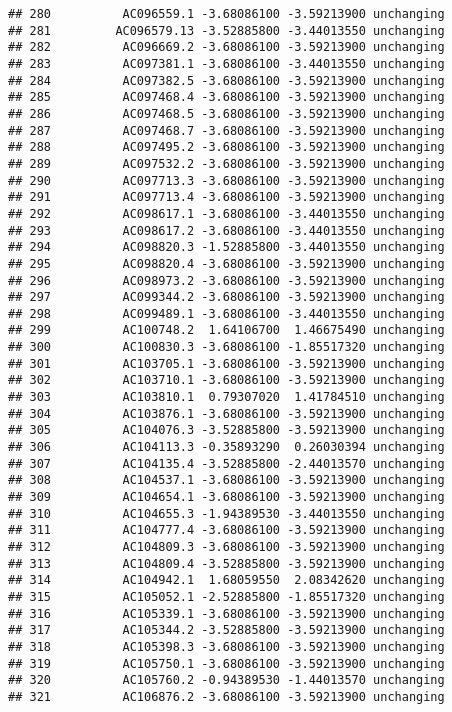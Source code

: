 \documentclass[]{article}
\begin{document}
\begin{verbatim}
## 280          AC096559.1 -3.68086100 -3.59213900 unchanging
## 281         AC096579.13 -3.52885800 -3.44013550 unchanging
## 282          AC096669.2 -3.68086100 -3.59213900 unchanging
## 283          AC097381.1 -3.68086100 -3.44013550 unchanging
## 284          AC097382.5 -3.68086100 -3.59213900 unchanging
## 285          AC097468.4 -3.68086100 -3.59213900 unchanging
## 286          AC097468.5 -3.68086100 -3.59213900 unchanging
## 287          AC097468.7 -3.68086100 -3.59213900 unchanging
## 288          AC097495.2 -3.68086100 -3.59213900 unchanging
## 289          AC097532.2 -3.68086100 -3.59213900 unchanging
## 290          AC097713.3 -3.68086100 -3.59213900 unchanging
## 291          AC097713.4 -3.68086100 -3.59213900 unchanging
## 292          AC098617.1 -3.68086100 -3.44013550 unchanging
## 293          AC098617.2 -3.68086100 -3.44013550 unchanging
## 294          AC098820.3 -1.52885800 -3.44013550 unchanging
## 295          AC098820.4 -3.68086100 -3.59213900 unchanging
## 296          AC098973.2 -3.68086100 -3.59213900 unchanging
## 297          AC099344.2 -3.68086100 -3.59213900 unchanging
## 298          AC099489.1 -3.68086100 -3.44013550 unchanging
## 299          AC100748.2  1.64106700  1.46675490 unchanging
## 300          AC100830.3 -3.68086100 -1.85517320 unchanging
## 301          AC103705.1 -3.68086100 -3.59213900 unchanging
## 302          AC103710.1 -3.68086100 -3.59213900 unchanging
## 303          AC103810.1  0.79307020  1.41784510 unchanging
## 304          AC103876.1 -3.68086100 -3.59213900 unchanging
## 305          AC104076.3 -3.52885800 -3.59213900 unchanging
## 306          AC104113.3 -0.35893290  0.26030394 unchanging
## 307          AC104135.4 -3.52885800 -2.44013570 unchanging
## 308          AC104537.1 -3.68086100 -3.59213900 unchanging
## 309          AC104654.1 -3.68086100 -3.59213900 unchanging
## 310          AC104655.3 -1.94389530 -3.44013550 unchanging
## 311          AC104777.4 -3.68086100 -3.59213900 unchanging
## 312          AC104809.3 -3.68086100 -3.59213900 unchanging
## 313          AC104809.4 -3.52885800 -3.59213900 unchanging
## 314          AC104942.1  1.68059550  2.08342620 unchanging
## 315          AC105052.1 -2.52885800 -1.85517320 unchanging
## 316          AC105339.1 -3.68086100 -3.59213900 unchanging
## 317          AC105344.2 -3.52885800 -3.59213900 unchanging
## 318          AC105398.3 -3.68086100 -3.59213900 unchanging
## 319          AC105750.1 -3.68086100 -3.59213900 unchanging
## 320          AC105760.2 -0.94389530 -1.44013570 unchanging
## 321          AC106876.2 -3.68086100 -3.59213900 unchanging

\end{verbatim}
\end{document}
